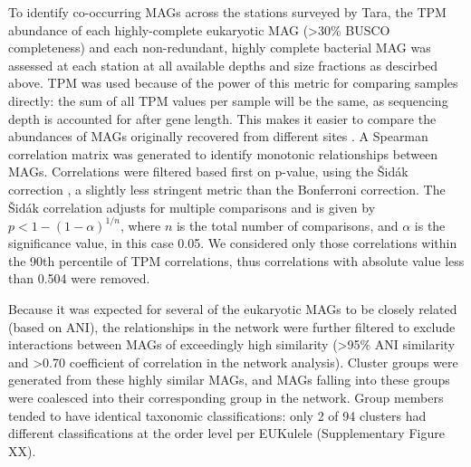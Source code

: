 \documentclass[12pt]{article}
\numberwithin{equation}{section}
\begin{document}
To identify co-occurring MAGs across the stations surveyed by Tara, the TPM abundance of each highly-complete eukaryotic MAG (>30\% BUSCO completeness) and each non-redundant, highly complete bacterial MAG was assessed at each station at all available depths and size fractions as descirbed above. TPM was used because of the power of this metric for comparing samples directly: the sum of all TPM values per sample will be the same, as sequencing depth is accounted for after gene length. This makes it easier to compare the abundances of MAGs originally recovered from different sites \citep{Gradoville_2017,}.  A Spearman correlation matrix was generated to identify monotonic relationships between MAGs. Correlations were filtered based first on p-value, using the Šidák correction \citep{Sidak_1967}, a slightly less stringent metric than the Bonferroni correction. The Šidák correlation adjusts for multiple comparisons and is given by $p < 1-(1-\alpha)^{1/n}$, where $n$ is the total number of comparisons, and $\alpha$ is the significance value, in this case 0.05. We considered only those correlations within the 90th percentile of TPM correlations, thus correlations with absolute value less than 0.504 were removed. 

Because it was expected for several of the eukaryotic MAGs to be closely related (based on ANI), the relationships in the network were further filtered to exclude interactions between MAGs of exceedingly high similarity (>95\% ANI similarity and >0.70 coefficient of correlation in the network analysis). Cluster groups were generated from these highly similar MAGs, and MAGs falling into these groups were coalesced into their corresponding group in the network. Group members tended to have identical taxonomic classifications: only 2 of 94 clusters had different classifications at the order level per EUKulele (Supplementary Figure XX).




\end{document}
